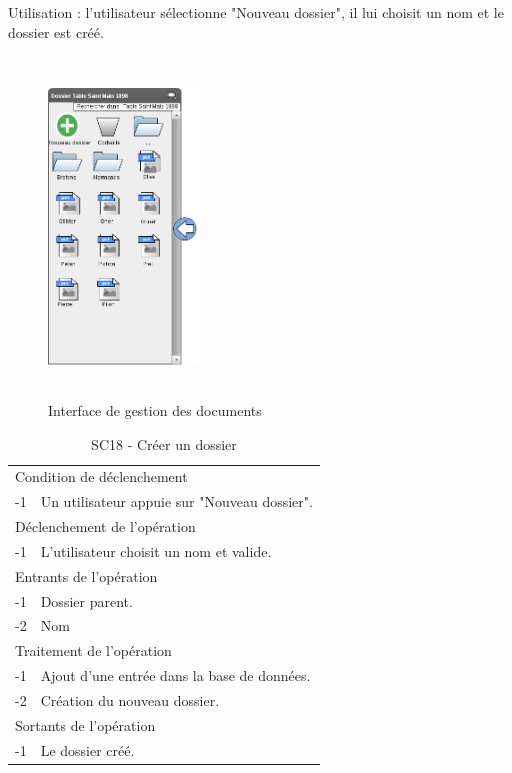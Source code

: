 \documentclass[a4paper]{article}
\begin{document}
Utilisation : l'utilisateur sélectionne "Nouveau dossier", il lui choisit un nom et le dossier est créé.

\begin{figure}[H]
\centering
\includegraphics[width=4cm,height=9cm]{interface_mesdocuments.png}
\caption{Interface de gestion des documents}
\label{fig:interface_mesdocuments}
\end{figure}

\begin{table}[H]
  \centering
   \small
	\begin{tabular}{|c|p{12cm}|}
   		\hline
   			\rowcolor{lightgray}\multicolumn{2}{|c|}{\textbf{SC18 - Créer un dossier}} \\
   		\hline
   			\multicolumn{2}{|l|}{Condition de d\'eclenchement} \\
   		\hline
   			-1 & Un utilisateur appuie sur "Nouveau dossier". \\
   		\hline
   			\multicolumn{2}{|l|}{D\'eclenchement de l'op\'eration} \\
   		\hline
   			-1 & L'utilisateur choisit un nom et valide. \\
   		\hline
   			\multicolumn{2}{|l|}{Entrants de l'op\'eration} \\
   		\hline
   			-1 & Dossier parent.\\
        		-2 & Nom\\
   		\hline
   			\multicolumn{2}{|l|}{Traitement de l'op\'eration} \\
  		\hline
   			-1 & Ajout d'une entr\'ee dans la base de donn\'ees. \\
			-2 & Création du nouveau dossier. \\
   		\hline
   			\multicolumn{2}{|l|}{Sortants de l'op\'eration} \\
   		\hline
   			-1 & Le dossier créé. \\
   		\hline
	\end{tabular}
  \caption{SC18 - Créer un dossier}
  \normalsize
  \label{tab:creer_document}
\end{table}
\end{document}
